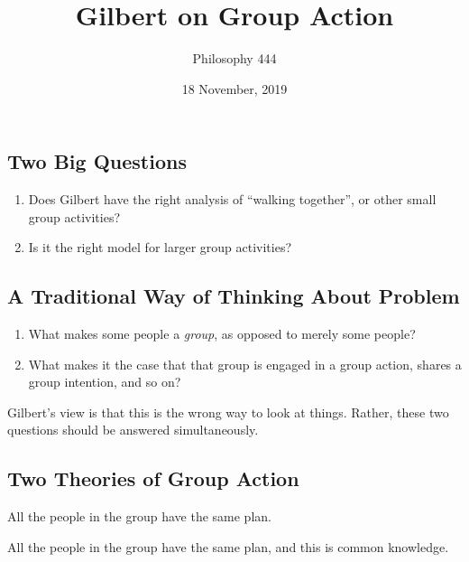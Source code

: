 \documentclass[11pt,]{article}
\title{Gilbert on Group Action}
\author{Philosophy 444}
\date{18 November, 2019}
\providecommand{\tightlist}{%
  \setlength{\itemsep}{0pt}\setlength{\parskip}{0pt}}
\begin{document}
\maketitle

\hypertarget{two-big-questions}{%
\subsection{Two Big Questions}\label{two-big-questions}}

\begin{enumerate}
\def\labelenumi{\arabic{enumi}.}
\tightlist
\item
  Does Gilbert have the right analysis of ``walking together'', or other
  small group activities?
\item
  Is it the right model for larger group activities?
\end{enumerate}

\hypertarget{a-traditional-way-of-thinking-about-problem}{%
\subsection{A Traditional Way of Thinking About
Problem}\label{a-traditional-way-of-thinking-about-problem}}

\begin{enumerate}
\def\labelenumi{\arabic{enumi}.}
\tightlist
\item
  What makes some people a \emph{group}, as opposed to merely some
  people?
\item
  What makes it the case that that group is engaged in a group action,
  shares a group intention, and so on?
\end{enumerate}

Gilbert's view is that this is the wrong way to look at things. Rather,
these two questions should be answered simultaneously.

\hypertarget{two-theories-of-group-action}{%
\subsection{Two Theories of Group
Action}\label{two-theories-of-group-action}}

\begin{description}
\tightlist
\item[Weak Shared Plan]
All the people in the group have the same plan.
\item[Strong Shared Plan]
All the people in the group have the same plan, and this is common
knowledge.
\end{description}
\end{document}
